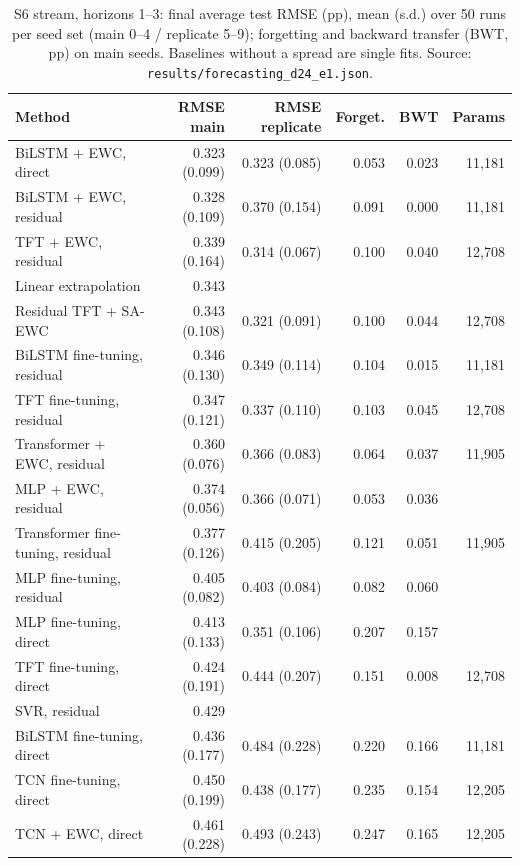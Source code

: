 \begin{table}[t]
  \centering
  \caption{S6 stream, horizons 1--3: final average test RMSE (pp), mean (s.d.) over 50 runs per seed set (main 0--4 / replicate 5--9); forgetting and backward transfer (BWT, pp) on main seeds. Baselines without a spread are single fits. Source: \texttt{results/forecasting\_d24\_e1.json}.}
  \label{tab:d24-comparison-e1}
  \setlength{\tabcolsep}{3pt}
  \scriptsize
  \begin{tabular}{lrrrrr}
    \toprule
    Method & RMSE main & RMSE replicate & Forget. & BWT & Params \\
    \midrule
    BiLSTM + EWC, direct & 0.323 (0.099) & 0.323 (0.085) & 0.053 & 0.023 & 11,181 \\
    BiLSTM + EWC, residual & 0.328 (0.109) & 0.370 (0.154) & 0.091 & 0.000 & 11,181 \\
    TFT + EWC, residual & 0.339 (0.164) & 0.314 (0.067) & 0.100 & 0.040 & 12,708 \\
    Linear extrapolation & 0.343 &  &  &  &  \\
    Residual TFT + SA-EWC & 0.343 (0.108) & 0.321 (0.091) & 0.100 & 0.044 & 12,708 \\
    BiLSTM fine-tuning, residual & 0.346 (0.130) & 0.349 (0.114) & 0.104 & 0.015 & 11,181 \\
    TFT fine-tuning, residual & 0.347 (0.121) & 0.337 (0.110) & 0.103 & 0.045 & 12,708 \\
    Transformer + EWC, residual & 0.360 (0.076) & 0.366 (0.083) & 0.064 & 0.037 & 11,905 \\
    MLP + EWC, residual & 0.374 (0.056) & 0.366 (0.071) & 0.053 & 0.036 &  \\
    Transformer fine-tuning, residual & 0.377 (0.126) & 0.415 (0.205) & 0.121 & 0.051 & 11,905 \\
    MLP fine-tuning, residual & 0.405 (0.082) & 0.403 (0.084) & 0.082 & 0.060 &  \\
    MLP fine-tuning, direct & 0.413 (0.133) & 0.351 (0.106) & 0.207 & 0.157 &  \\
    TFT fine-tuning, direct & 0.424 (0.191) & 0.444 (0.207) & 0.151 & 0.008 & 12,708 \\
    SVR, residual & 0.429 &  &  &  &  \\
    BiLSTM fine-tuning, direct & 0.436 (0.177) & 0.484 (0.228) & 0.220 & 0.166 & 11,181 \\
    TCN fine-tuning, direct & 0.450 (0.199) & 0.438 (0.177) & 0.235 & 0.154 & 12,205 \\
    TCN + EWC, direct & 0.461 (0.228) & 0.493 (0.243) & 0.247 & 0.165 & 12,205 \\

\end{tabular}
\end{table}

